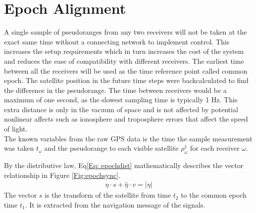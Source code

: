 
\section{Epoch Alignment} \label{sec:epochalignment}

A single sample of pseudoranges from any two receivers will not be taken at the exact same time without a connecting network to implement control. This increases the setup requirements which in turn increases the cost of the system and reduces the ease of compatibility with different receivers. The earliest time between all the receivers will be used as the time reference point called common epoch. The satellite position in the future time steps were backcalculated to find the difference in the pseudorange. The time between receivers would be a maximum of one second, as the slowest sampling time is typically 1 Hz. This extra distance is only in the vacuum of space and is not affected by potential nonlinear affects such as ionosphere and troposphere errors that affect the speed of light.\\

The known variables from the raw GPS data is the time the sample measurement was taken $t_\omega$ and the pseudorange to each visible satellite $\rho_\omega^1$ for each receiver $\omega$.

By the distributive law, Eq\eqref{Eq: epochdist} mathematically describes the vector relationship in Figure \ref{Fig:epochsync}.
\begin{eqnarray}
\hat{\eta}\cdot s + \hat{\eta}\cdot v = |\eta|  \label{Eq: epochdist}
\end{eqnarray}
The vector $s$ is the transform of the satellite from time $t_2$ to the common epoch time $t_1$. It is extracted from the navigation message of the signals.

